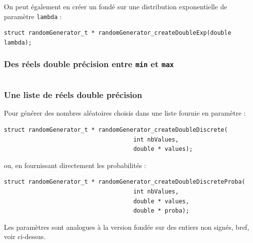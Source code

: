    On peut également en créer un fondé sur une distribution
exponentielle de paramètre {\tt lambda} :

\begin{verbatim}
struct randomGenerator_t * randomGenerator_createDoubleExp(double lambda);
\end{verbatim}

%
\subsubsection{Des réels double précision entre {\tt min} et {\tt max}}

\begin{verbatim}
\end{verbatim}

%
\subsubsection{Une liste de réels double précision}

   Pour générer des nombres aléatoires choisis dans une liste fournie
en paramètre :

\begin{verbatim}
struct randomGenerator_t * randomGenerator_createDoubleDiscrete(
                                     int nbValues,
                                     double * values);
\end{verbatim}

   ou, en fournissant directement les probabilités :

\begin{verbatim}
struct randomGenerator_t * randomGenerator_createDoubleDiscreteProba(
                                     int nbValues,
                                     double * values,
                                     double * proba);
\end{verbatim}

   Les paramètres sont analogues à la version fondée sur des entiers
non signés, bref, voir ci-dessus.

%
